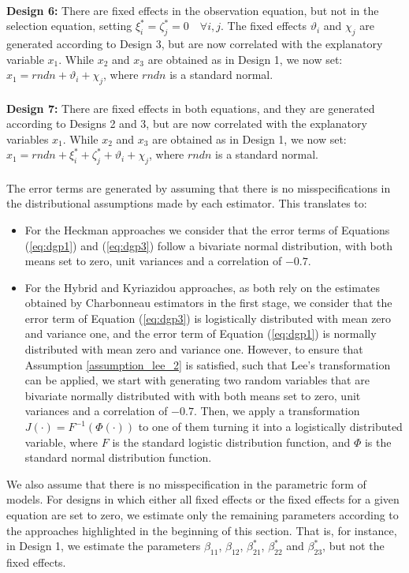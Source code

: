 \\
\textbf{Design 6:} There are fixed effects in the observation equation, but not in the selection equation, setting $\xi_{i}^* = \zeta_{j}^* = 0 \quad \forall i,j$. The fixed effects $\vartheta_i$ and $\chi_j$ are generated according to Design 3, but are now correlated with the explanatory variable $x_1$. While $x_2$ and $x_3$ are obtained as in Design 1, we now set: $x_1 = \textit{rndn} + \vartheta_i + \chi_j$, where $\textit{rndn}$ is a standard normal. \\
\\
\textbf{Design 7:} There are fixed effects in both equations, and they are generated according to Designs 2 and 3, but are now correlated with the explanatory variables $x_1$. While $x_2$ and $x_3$ are obtained as in Design 1, we now set: $x_1 = \textit{rndn} + \xi_{i}^* + \zeta_{j}^* + \vartheta_i + \chi_j$, where $\textit{rndn}$ is a standard normal. \\
\\
The error terms are generated by assuming that there is no misspecifications in the distributional assumptions made by each estimator. This translates to:

\begin{itemize}
  \item For the Heckman approaches we consider that the error terms of Equations (\ref{eq:dgp1}) and (\ref{eq:dgp3}) follow a bivariate normal distribution, with both means set to zero, unit variances and a correlation of $-0.7$.
  \item For the Hybrid and Kyriazidou approaches, as both rely on the estimates obtained by Charbonneau estimators in the first stage, we consider that the error term of Equation (\ref{eq:dgp3}) is logistically distributed with mean zero and variance one, and the error term of Equation (\ref{eq:dgp1}) is normally distributed with mean zero and variance one. However, to ensure that Assumption \ref{assumption_lee_2} is satisfied, such that Lee's transformation can be applied, we start with generating two random variables that are bivariate normally distributed with with both means set to zero, unit variances and a correlation of $-0.7$. Then, we apply a transformation $J(\cdot) = F^{-1}(\Phi(\cdot))$ to one of them turning it into a logistically distributed variable, where $F$ is the standard logistic distribution function, and $\Phi$ is the standard normal distribution function.
\end{itemize}

We also assume that there is no misspecification in the parametric form of models. For designs in which either all fixed effects or the fixed effects for a given equation are set to zero, we estimate only the remaining parameters according to the approaches highlighted in the beginning of this section. That is, for instance, in Design 1, we estimate the parameters $\beta_{11}$, $\beta_{12}$, $\beta_{21}^*$, $\beta_{22}^*$ and $\beta_{23}^*$, but not the fixed effects.   

